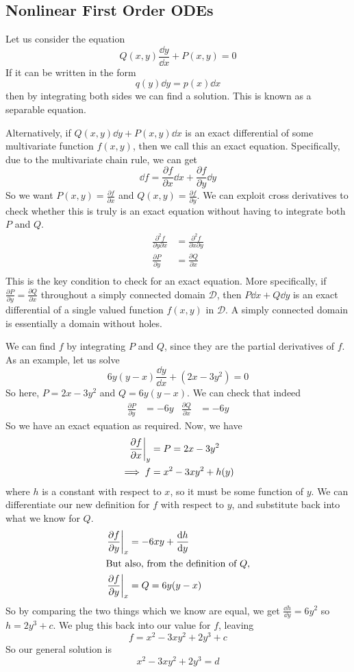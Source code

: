 \documentclass{article}
\begin{document}
	\subsection{Nonlinear First Order ODEs}
	Let us consider the equation
	\[ Q(x, y)\frac{\dd y}{\dd x} + P(x, y) = 0 \]
	If it can be written in the form
	\[ q(y) \dd y = p(x) \dd x \]
	then by integrating both sides we can find a solution. This is known as a separable equation.
	
	Alternatively, if $Q(x, y)\dd y + P(x, y)\dd x$ is an exact differential of some multivariate function $f(x, y)$, then we call this an exact equation. Specifically, due to the multivariate chain rule, we can get
	\[ \dd f = \frac{\partial f}{\partial x} \dd x + \frac{\partial f}{\partial y} \dd y \]
	So we want $P(x, y) = \frac{\partial f}{\partial x}$ and $Q(x, y) = \frac{\partial f}{\partial y}$. We can exploit cross derivatives to check whether this is truly is an exact equation without having to integrate both $P$ and $Q$.
	\begin{align*}
		\frac{\partial^2 f}{\partial y \partial x} &= \frac{\partial^2 f}{\partial x \partial y} \\
		\frac{\partial P}{\partial y} &= \frac{\partial Q}{\partial x} \\
	\end{align*}
	This is the key condition to check for an exact equation. More specifically, if $\frac{\partial P}{\partial y} = \frac{\partial Q}{\partial x}$ throughout a simply connected domain $\mathcal D$, then $P \dd x + Q \dd y$ is an exact differential of a single valued function $f(x, y)$ in $\mathcal D$. A simply connected domain is essentially a domain without holes.
	
	We can find $f$ by integrating $P$ and $Q$, since they are the partial derivatives of $f$. As an example, let us solve 
	\[ 6y(y-x)\frac{\dd y}{\dd x} + (2x - 3y^2) = 0 \]
	So here, $P = 2x - 3y^2$ and $Q = 6y(y-x)$. We can check that indeed
	\begin{align*}
		 \frac{\partial P}{\partial y} &= -6y & \frac{\partial Q}{\partial x} &= -6y
	\end{align*}
	So we have an exact equation as required. Now, we have
	\begin{align*}
		\eval{\frac{\partial f}{\partial x}}_y &= P = 2x - 3y^2 \\
		\implies f &= x^2 - 3xy^2 + h(y)
	\end{align*}
	where $h$ is a constant with respect to $x$, so it must be some function of $y$. We can differentiate our new definition for $f$ with respect to $y$, and substitute back into what we know for $Q$.
	\begin{align*}
		\eval{\frac{\partial f}{\partial y}}_x &= -6xy + \frac{\dd h}{\dd y} \\
		\intertext{But also, from the definition of $Q$,}
		\eval{\frac{\partial f}{\partial y}}_x &= Q = 6y(y-x) \\
	\end{align*}
	So by comparing the two things which we know are equal, we get $\frac{\dd h}{\dd y} = 6y^2$ so $h = 2y^3 + c$. We plug this back into our value for $f$, leaving
	\[ f = x^2 - 3xy^2 + 2y^3 + c \]
	So our general solution is
	\[ x^2 - 3xy^2 + 2y^3 = d \]
\end{document}
